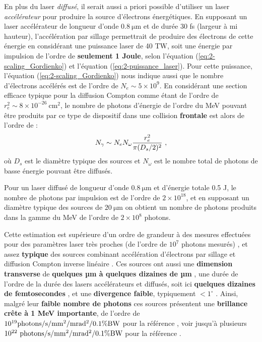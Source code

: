 \begin{refsection}
En plus du laser \textit{diffusé}, il serait aussi a priori possible d'utiliser un laser \textit{accélérateur} pour produire la source d'électrons énergétiques. En supposant un laser accélérateur de longueur d'onde $0.8 ~ \si{\um}$ et de durée 30 fs (largeur à mi hauteur), l'accélération par sillage permettrait de produire des électrons de cette énergie en considérant une puissance laser de 40 TW, soit une énergie par impulsion de l'ordre de \textbf{seulement 1 Joule}, selon l'équation (\ref{eq:2-scaling_Gordienko}) et l'équation (\ref{eq:2-puissance_laser}). Pour cette puissance, l'équation (\ref{eq:2-scaling_Gordienko}) nous indique aussi que le nombre d'électrons accélérés est de l'ordre de $N_e \sim 5 \times 10^{9}$. 
En considérant une section efficace typique pour la diffusion Compton comme étant de l'ordre de $r_e^2 \sim 8 \times 10^{-26} ~ \si{\cm^2}$, le nombre de photons d'énergie de l'ordre du MeV pouvant être produits par ce type de dispositif dans une collision \textbf{frontale} est alors de l'ordre de \parencite{albert_2016, micieli_2016a} :
\begin{equation}
    N_\gamma \sim N_e N_{\omega} \dfrac{r_e^2}{\pi (D_s/2)^2} ~ \rm ,
\end{equation}
où $D_s$ est le diamètre typique des sources et $N_\omega$ est le nombre total de photons de basse énergie pouvant être diffusés. 

Pour un laser diffusé de longueur d'onde $0.8 ~ \si{\um}$ et d'énergie totale 0.5 J, le nombre de photons par impulsion est de l'ordre de $2 \times 10^{18}$, et en supposant un diamètre typique des sources de $20 ~ \si{\um}$ on obtient un nombre de photons produits dans la gamme du MeV de l'ordre de $2 \times 10^8$ photons. 

Cette estimation est supérieure d'un ordre de grandeur à des mesures effectuées pour des paramètres laser très proches (de l'ordre de $10^7$ photons mesurés) \parencite{chen_2013a}, et assez \textbf{typique} des sources combinant accélération d'électrons par sillage et diffusion Compton inverse linéaire \parencite{albert_2016}. Ces sources ont aussi une \textbf{dimension transverse} de \textbf{quelques µm à quelques dizaines de µm} \parencite{chen_2013a}, une durée de l'ordre de la durée des lasers accélérateurs et diffusés, soit ici \textbf{quelques dizaines de femtosecondes} \parencite{corde_2013a}, et une \textbf{divergence faible}, typiquement $<1^\circ$ \parencite{chen_2013a}. Ainsi, malgré leur \textbf{faible nombre de photons} ces sources présentent une \textbf{brillance crête à 1 MeV importante}, de l'ordre de $10^{19} \rm photons /s/mm^2/mrad^2/0.1\%BW$ pour la référence \parencite{chen_2013a}, voir jusqu'à plusieurs $10^{22} ~ \rm photons /s/mm^2/mrad^2/0.1\%BW$ pour la référence \parencite{yu_2016}. 


\end{refsection}
